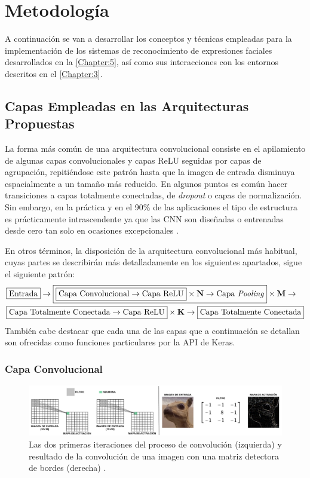 \chapter{Metodología} \label{Chapter:4}

A continuación se van a desarrollar los conceptos y técnicas empleadas para la implementación de los sistemas de reconocimiento de expresiones faciales desarrollados en la \autoref{Chapter:5}, así como sus interacciones con los entornos descritos en el \autoref{Chapter:3}.

\section{Capas Empleadas en las Arquitecturas Propuestas} \label{Chapter:Layers}

La forma más común de una arquitectura convolucional consiste en el apilamiento de algunas capas convolucionales y capas ReLU seguidas por capas de agrupación, repitiéndose este patrón hasta que la imagen de entrada disminuya espacialmente a un tamaño más reducido. En algunos puntos es común hacer transiciones a capas totalmente conectadas, de \textit{dropout} o capas de normalización. Sin embargo, en la práctica y en el 90\% de las aplicaciones el tipo de estructura es prácticamente intrascendente ya que las CNN son diseñadas o entrenadas desde cero tan solo en ocasiones excepcionales \cite{CS231n}.

En otros términos, la disposición de la arquitectura convolucional más habitual, cuyas partes se describirán más detalladamente en los siguientes apartados, sigue el siguiente patrón:
\begin{align*}
    &\boxed{\text{Entrada}} \rightarrow \boxed{\boxed{\text{Capa Convolucional} \rightarrow \text{Capa ReLU}} \times \textbf{N} \rightarrow \text{Capa \textit{Pooling}}} \times \textbf{M} \rightarrow \\ 
    & \boxed{\text{Capa Totalmente Conectada} \rightarrow \text{Capa ReLU}} \times \textbf{K} \rightarrow \boxed{\text{Capa Totalmente Conectada}}
\end{align*}
También cabe destacar que cada una de las capas que a continuación se detallan son ofrecidas como funciones particulares por la API de Keras.

\subsection{Capa Convolucional}

\begin{figure}
    \centering
    \includegraphics[width=\textwidth]{Images/ConvOperation.png}
    \caption{Las dos primeras iteraciones del proceso de convolución (izquierda) \cite{img:ConvOperation1} y resultado de la convolución de una imagen con una matriz detectora de bordes (derecha) \cite{img:ConvOperation2}.}
    \label{fig:ConvOperation}
\end{figure}

